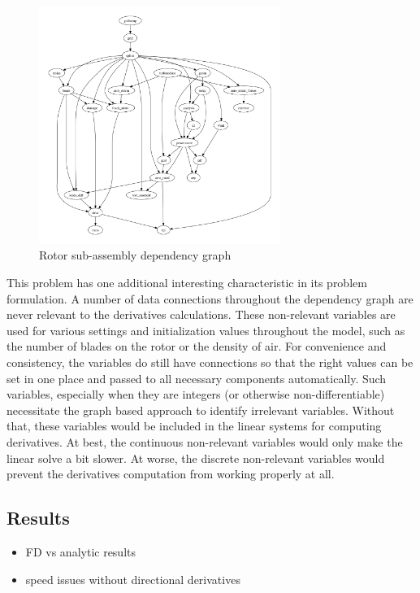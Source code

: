 \documentclass[]{aiaa-tc} %
\begin{document}
    \begin{figure}[!htbp]
        \centering
        \includegraphics[width=0.7\textwidth]{images/rotor_depgraph}
        \caption{Rotor sub-assembly dependency graph}
        \label{fig:wt_sub_depgraph}
    \end{figure}


    This problem has one additional interesting characteristic in its
    problem formulation. A number of data connections throughout the dependency
    graph are never relevant to the derivatives calculations. These non-relevant
    variables are used for various settings and initialization values throughout the
    model, such as the number of blades on the rotor or the density of air. For convenience 
    and consistency, the variables do still have connections so that the right values can 
    be set in one place and passed to all necessary components automatically. 
    Such variables, especially when they are integers (or otherwise non-differentiable)
    necessitate the graph based approach to identify irrelevant variables. Without that, these
    variables would be included in the linear systems for computing derivatives. At best, 
    the continuous non-relevant variables would only make the linear solve a bit slower. 
    At worse, the discrete non-relevant variables would prevent the derivatives computation from working properly at all. 

    \subsection{Results}
        \begin{itemize}
            \item FD vs analytic results
            \item speed issues without directional derivatives
        \end{itemize}
\end{document}
